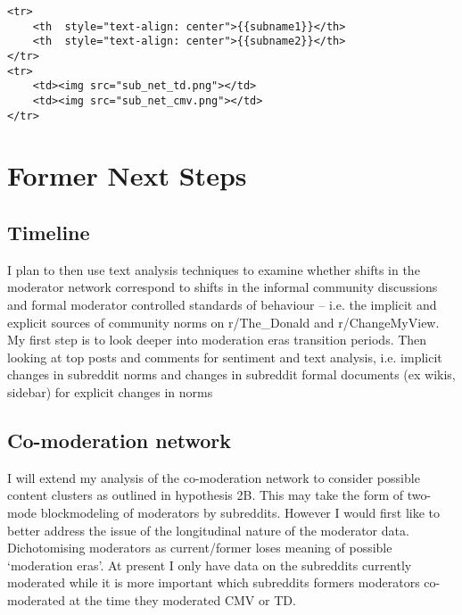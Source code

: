 \documentclass[11pt]{article}
\begin{document}
\begin{verbatim}
<tr>
    <th  style="text-align: center">{{subname1}}</th>
    <th  style="text-align: center">{{subname2}}</th>
</tr>
<tr>
    <td><img src="sub_net_td.png"></td>
    <td><img src="sub_net_cmv.png"></td>
</tr>
\end{verbatim}

    \section{Former Next Steps}\label{former-next-steps}

\subsection{Timeline}\label{timeline}

I plan to then use text analysis techniques to examine whether shifts in
the moderator network correspond to shifts in the informal community
discussions and formal moderator controlled standards of behaviour --
i.e. the implicit and explicit sources of community norms on
r/The\_Donald and r/ChangeMyView. My first step is to look deeper into
moderation eras transition periods. Then looking at top posts and
comments for sentiment and text analysis, i.e. implicit changes in
subreddit norms and changes in subreddit formal documents (ex wikis,
sidebar) for explicit changes in norms

\subsection{Co-moderation network}\label{co-moderation-network}

I will extend my analysis of the co-moderation network to consider
possible content clusters as outlined in hypothesis 2B. This may take
the form of two-mode blockmodeling of moderators by subreddits. However
I would first like to better address the issue of the longitudinal
nature of the moderator data. Dichotomising moderators as current/former
loses meaning of possible `moderation eras'. At present I only have data
on the subreddits currently moderated while it is more important which
subreddits formers moderators co-moderated at the time they moderated
CMV or TD.


    
    
    
    
\end{document}
